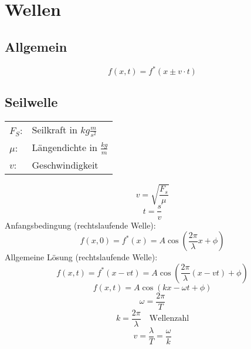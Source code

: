 



\chapter{Wellen}
\section{Allgemein}
\[ \boxed{f(x,t) = f^*(x \pm v \cdot t)} \]

\section{Seilwelle}
\begin{tabular}{@{}ll}
$F_S$:   & Seilkraft in $kg \frac{m}{s^2}$ \\
$\mu$:  & Längendichte in $\frac{kg}{m}$ \\
$v$:    & Geschwindigkeit
\end{tabular}
\[ \boxed{v = \sqrt{\frac{F_s}{\mu}}} \]
\[ \boxed{t = \frac{s}{v}} \]
Anfangsbedingung (rechtslaufende Welle): 
\[ \boxed{f(x,0) = f^*(x) = A \cos(\frac{2 \pi}{\lambda} x + \phi)} \]
Allgemeine Lösung (rechtslaufende Welle): 
\[ \boxed{f(x,t) = f^*(x-vt) = A \cos (\frac{2 \pi}{\lambda}(x-vt)+\phi)} \]
\[ \boxed{f(x,t) = A \cos(kx-\omega t + \phi)} \]
\[ \boxed{\omega = \frac{2 \pi}{T}} \]
\[ \boxed{k = \frac{2 \pi}{\lambda} \quad \text{Wellenzahl}} \]
\[ \boxed{v = \frac{\lambda}{T} = \frac{\omega}{k}} \]

